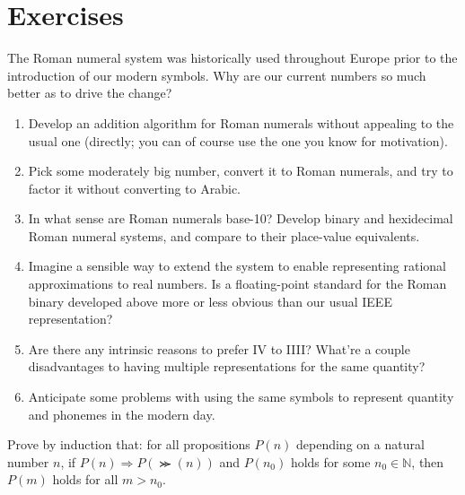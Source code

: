 
\section{Exercises}

\begin{prob}
  The Roman numeral system was historically used throughout Europe prior to the introduction of our modern symbols.
  Why are our current numbers so much better as to drive the change?
  \begin{enumerate}
  \item Develop an addition algorithm for Roman numerals without appealing to the usual one
    (directly; you can of course use the one you know for motivation).
  \item Pick some moderately big number, convert it to Roman numerals, and try to factor it without converting to Arabic.
  \item In what sense are Roman numerals base-10?
    Develop binary and hexidecimal Roman numeral systems, and compare to their place-value equivalents.
  \item Imagine a sensible way to extend the system to enable representing rational approximations to real numbers.
    Is a floating-point standard for the Roman binary developed above more or less obvious than our usual IEEE representation?
  \item Are there any intrinsic reasons to prefer IV to IIII?
    What're a couple disadvantages to having multiple representations for the same quantity?
  \item Anticipate some problems with using the same symbols to represent quantity and phonemes in the modern day.
  \end{enumerate}
\end{prob}

\begin{prob}
  Prove by induction that: for all propositions $P(n)$ depending on a natural number $n$, if $P(n) \Rightarrow P(\Succ(n))$
  and $P(n_{0})$ holds for some $n_{0} \in \mathbb{N}$, then $P(m)$ holds for all $m > n_{0}$.
\end{prob}

